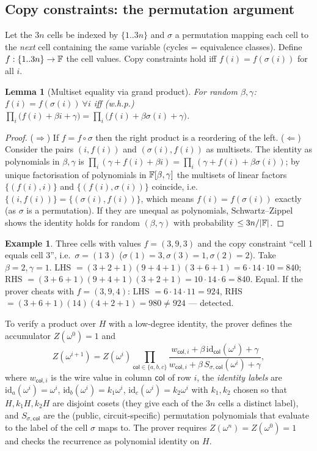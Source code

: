 \documentclass[11pt,a4paper]{report}
\theoremstyle{plain}
\newtheorem{lemma}[theorem]{Lemma}
\theoremstyle{definition}
\newtheorem{example}[theorem]{Example}
\theoremstyle{remark}
\begin{document}
\subsection{Copy constraints: the permutation argument}
Let the $3n$ cells be indexed by $\{1..3n\}$ and $\sigma$ a permutation mapping each cell to the \emph{next} cell containing the same variable (cycles = equivalence classes). Define $f:\{1..3n\}\to\mathbb{F}$ the cell values. Copy constraints hold iff $f(i)=f(\sigma(i))$ for all $i$.
\begin{lemma}[Multiset equality via grand product]\label{lem:perm}
For random $\beta,\gamma$: $f(i)=f(\sigma(i))\ \forall i$ iff (w.h.p.) $\prod_i\big(f(i)+\beta i+\gamma\big)=\prod_i\big(f(i)+\beta\sigma(i)+\gamma\big)$.
\end{lemma}
\begin{proof}
($\Rightarrow$) If $f=f\circ\sigma$ then the right product is a reordering of the left. ($\Leftarrow$) Consider the pairs $(i,f(i))$ and $(\sigma(i),f(i))$ as multisets. The identity as polynomials in $\beta,\gamma$ is $\prod_i(\gamma+f(i)+\beta i)=\prod_i(\gamma+f(i)+\beta\sigma(i))$; by unique factorisation of polynomials in $\mathbb{F}[\beta,\gamma]$ the multisets of linear factors $\{(f(i),i)\}$ and $\{(f(i),\sigma(i))\}$ coincide, i.e.\ $\{(i,f(i))\}=\{(\sigma(i),f(i))\}$, which means $f(i)=f(\sigma(i))$ exactly (as $\sigma$ is a permutation). If they are unequal as polynomials, Schwartz--Zippel shows the identity holds for random $(\beta,\gamma)$ with probability $\le3n/|\mathbb{F}|$.
\end{proof}
\begin{example}
Three cells with values $f=(3,9,3)$ and the copy constraint ``cell 1 equals cell 3'', i.e.\ $\sigma=(1\ 3)$ ($\sigma(1)=3,\sigma(3)=1,\sigma(2)=2$). Take $\beta=2,\gamma=1$. LHS $=(3+2+1)(9+4+1)(3+6+1)=6\cdot14\cdot10=840$; RHS $=(3+6+1)(9+4+1)(3+2+1)=10\cdot14\cdot6=840$. Equal. If the prover cheats with $f=(3,9,4)$: LHS $=6\cdot14\cdot11=924$, RHS $=(3+6+1)(14)(4+2+1)=980\ne924$ --- detected.
\end{example}
To verify a product over $H$ with a low-degree identity, the prover defines the accumulator $Z(\omega^0)=1$ and
\[Z(\omega^{i+1})=Z(\omega^i)\prod_{\mathsf{col}\in\{a,b,c\}}\frac{w_{\mathsf{col},i}+\beta\,\mathrm{id}_{\mathsf{col}}(\omega^i)+\gamma}{w_{\mathsf{col},i}+\beta\,S_{\sigma,\mathsf{col}}(\omega^i)+\gamma},\]
where $w_{\mathsf{col},i}$ is the wire value in column $\mathsf{col}$ of row $i$, the \emph{identity labels} are $\mathrm{id}_a(\omega^i)=\omega^i$, $\mathrm{id}_b(\omega^i)=k_1\omega^i$, $\mathrm{id}_c(\omega^i)=k_2\omega^i$ with $k_1,k_2$ chosen so that $H,k_1H,k_2H$ are disjoint cosets (they give each of the $3n$ cells a distinct label), and $S_{\sigma,\mathsf{col}}$ are the (public, circuit-specific) permutation polynomials that evaluate to the label of the cell $\sigma$ maps to. The prover requires $Z(\omega^{n})=Z(\omega^0)=1$ and checks the recurrence as polynomial identity on $H$.
\end{document}
